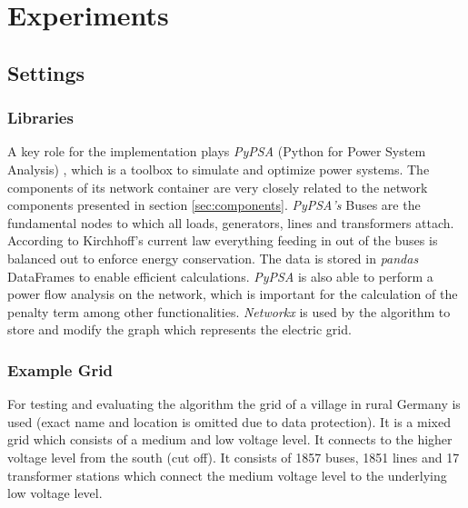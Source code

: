 \chapter{Experiments}\label{chap:experiments}

\section{Settings}
\subsection{Libraries}\label{pypsa}
A key role for the implementation plays \textit{PyPSA} (Python for Power System Analysis) \cite{brown2017pypsa}, which is a toolbox to simulate and optimize power systems. The components of its network container are very closely related to the network components presented in section \ref{sec:components}. \textit{PyPSA's} Buses are the fundamental nodes to which all loads, generators, lines and transformers attach. According to Kirchhoff's current law everything feeding in out of the buses is balanced out to enforce energy conservation. The data is stored in \textit{pandas} DataFrames to enable efficient calculations. \textit{PyPSA} is also able to perform a power flow analysis on the network, which is important for the calculation of the penalty term among other functionalities. \textit{Networkx} is used by the algorithm to store and modify the graph which represents the electric grid.

\subsection{Example Grid}
For testing and evaluating the algorithm the grid of a village in rural Germany is used (exact name and location is omitted due to data protection). It is a mixed grid which consists of a medium and low voltage level. It connects to the higher voltage level from the south (cut off). It consists of 1857 buses, 1851 lines and 17 transformer stations which connect the medium voltage level to the underlying low voltage level.


